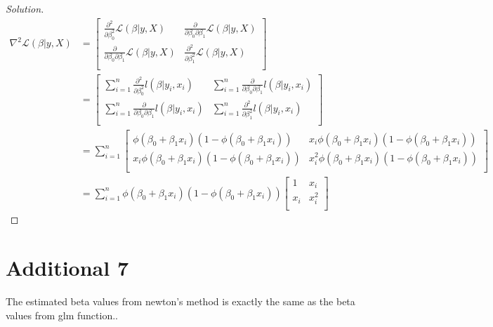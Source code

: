\documentclass{article}
\newenvironment{solution}
  {\renewcommand\qedsymbol{$\blacksquare$}\begin{proof}[Solution]$ $}
  {\end{proof}}
\begin{document}
\begin{solution}
\begin{align*}
    \nabla^2 \mathcal L (\beta | y, X) &= \begin{bmatrix}
    \frac{\partial^2}{\partial \beta_0^2} \mathcal L(\beta | y, X) &  \frac{\partial}{\partial \beta_0 \partial \beta_1} \mathcal L(\beta | y, X) \\
    \frac{\partial}{\partial \beta_0 \partial \beta_1} \mathcal L(\beta | y, X) & \frac{\partial^2}{\partial \beta_1^2} \mathcal L(\beta | y, X) \\
    \end{bmatrix} \\
    &= \begin{bmatrix}
        \sum_{i=1}^{n} \frac{\partial^2}{\partial \beta_0^2} l(\beta | y_i, x_i) & \sum_{i=1}^{n} \frac{\partial}{\partial \beta_0 \partial \beta_1} l(\beta | y_i, x_i) \\
        \sum_{i=1}^{n} \frac{\partial}{\partial \beta_0 \partial \beta_1} l(\beta | y_i, x_i) & \sum_{i=1}^{n} \frac{\partial^2}{\partial \beta_1^2} l(\beta | y_i, x_i) \\
    \end{bmatrix} \\
    &= \sum_{i=1}^{n} \begin{bmatrix}
        \phi(\beta_0 + \beta_1 x_i)(1-\phi(\beta_0 + \beta_1 x_i)) & x_i\phi(\beta_0 + \beta_1 x_i)(1-\phi(\beta_0 + \beta_1 x_i)) \\
        x_i\phi(\beta_0 + \beta_1 x_i)(1-\phi(\beta_0 + \beta_1 x_i)) & x_i^2\phi(\beta_0 + \beta_1 x_i)(1-\phi(\beta_0 + \beta_1 x_i)) \\
    \end{bmatrix} \\
    &= \sum_{i=1}^{n} \phi(\beta_0 + \beta_1 x_i)(1-\phi(\beta_0 + \beta_1 x_i)) \begin{bmatrix}
        1 & x_i \\
        x_i & x_i^2 \\
    \end{bmatrix}
\end{align*}
\end{solution}

\section{Additional 7}
The estimated beta values from newton's method is exactly the same as the beta values from glm function..

\inputminted{r}{multiple-logistic-regression.R}
\end{document}
